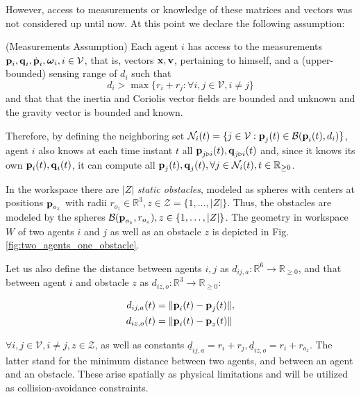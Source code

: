 However, access to measurements or knowledge of these matrices and vectors
was not considered up until now. At this point we declare the following
assumption:

\begin{assumption} (Measurements Assumption)
  Each agent $i$ has access to the measurements
  $\bm{\mathbf{p}}_i, \bm{\mathbf{q}}_i, \dot{\bm{\mathbf{p}}}_i, \bm{\mathbf{\omega}}_i, i\in\mathcal{V}$,
  that is, vectors $\bm{\mathbf{x}}, \bm{\mathbf{v}}$, pertaining to himself,
  and a (upper-bounded) sensing range of $d_i$ such that
  $$d_i > \max\{r_i + r_j : \forall i,j \in \mathcal{V}, i \neq j\}$$
  and that that the inertia and Coriolis vector fields are bounded and
  unknown and the gravity vector is bounded and known.
\end{assumption}

Therefore, by defining the neighboring set
$\mathcal{N}_i(t) = \{j\in\mathcal{V} : \bm{\mathbf{p}}_j(t)\in\mathcal{B}(\bm{\mathbf{p}}_i(t), d_i)\}$,
agent $i$ also knows at each time instant $t$ all
$\bm{\mathbf{p}}_{j \triangleright i}(t), \bm{\mathbf{q}}_{j \triangleright i}(t)$
and, since it knows its own $\bm{\mathbf{p}}_i(t), \bm{\mathbf{q}}_i(t)$, it can compute all
$\bm{\mathbf{p}}_{j}(t), \bm{\mathbf{q}}_{j}(t), \forall j\in \mathcal{N}_i(t),t\in\mathbb{R}_{\geq 0}$.

In the workspace there are $|Z|$ \textit{static obstacles}, modeled as
spheres with centers at positions
$\bm{\mathbf{p}}_{o_z}$ with radii $r_{o_z}\in \mathbb{R}^3, z \in \mathcal{Z} = \{1,\dots,|Z| \}$.
Thus, the obstacles are modeled by the spheres
$\mathcal{B}(\bm{\mathbf{p}}_{o_z}, r_{o_z}), z \in \{1,\dots,|Z|\}$. The geometry in
workspace $W$ of two agents $i$ and $j$ as well as an obstacle $z$ is depicted
in Fig. \ref{fig:two_agents_one_obstacle}.

Let us also define the distance between agents $i,j$ as
$d_{ij,a}: \mathbb{R}^6 \to \mathbb{R}_{\geq 0}$, and that between agent $i$
and obstacle $z$ as $d_{iz,o} : \mathbb{R}^3 \to \mathbb{R}_{\geq 0}$:

\begin{subequations}
	\begin{align}
    d_{ij,a}(t) &= \| \bm{\mathbf{p}}_i(t) - \bm{\mathbf{p}}_j(t) \|, \\
    d_{iz,o}(t) &= \| \bm{\mathbf{p}}_i(t) - \bm{\mathbf{p}}_z(t) \|
	\end{align}
\end{subequations}

$\forall i, j \in \mathcal{V}, i \neq j, z \in \mathcal{Z}$, as well as
constants $\underline{d}_{ij, a} = r_{i} + r_{j},
\underline{d}_{iz, o} = r_{i} + r_{o_z}$. The latter stand for the minimum
distance between two agents, and between an agent and an obstacle. These arise
spatially as physical limitations and will be utilized as collision-avoidance
constraints.

